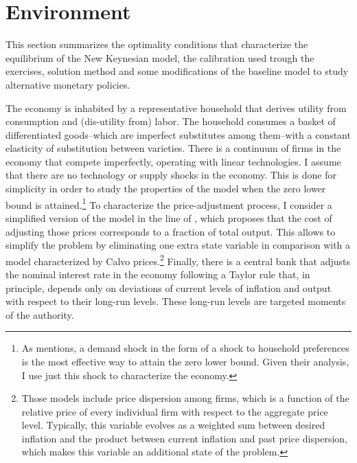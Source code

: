 \documentclass[12pt]{article}
\numberwithin{equation}{section}
\begin{document}
\section{Environment}\label{sec:model}

This section summarizes the optimality conditions that characterize the equilibrium of the New Keynesian model, the calibration used trough the exercises, solution method and some modifications of the baseline model to study alternative monetary policies. 

The economy is inhabited by a representative household that derives utility from consumption and (dis-utility from) labor. The household consumes a basket of differentiated goods--which are imperfect substitutes among them--with a constant elasticity of substitution between varieties. There is a continuum of firms in the economy that compete imperfectly, operating with linear technologies. I assume that there are no technology or supply shocks in the economy. This is done for simplicity in order to study the properties of the model when the zero lower bound is attained.\footnote{As \cite{Fernandez-VillaverdeEtAl2015} mentions, a demand shock in the form of a shock to household preferences is the most effective way to attain the zero lower bound. Given their analysis, I use just this shock to characterize the economy.} To characterize the price-adjustment process, I consider a simplified version of the model in the line of \cite{Rotemberg1982}, which proposes that the cost of adjusting those prices corresponds to a fraction of total output. This allows to simplify the problem by eliminating one extra state variable in comparison with a model characterized by Calvo prices.\footnote{Those models include price dispersion among firms, which is a function of the relative price of every individual firm with respect to the aggregate price level. Typically, this variable evolves as a weighted sum between desired inflation and the product between current inflation and past price dispersion, which makes this variable an additional state of the problem.} Finally, there is a central bank that adjusts the nominal interest rate in the economy following a Taylor rule that, in principle, depends only on deviations of current levels of inflation and output with respect to their long-run levels. These long-run levels are targeted moments of the authority. 
\end{document}

